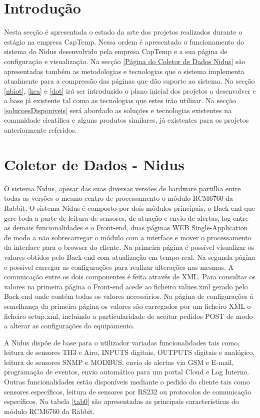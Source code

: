 
\section{Introdução}
Nesta secção é apresentada o estado da arte dos projetos realizados durante o estágio na empresa CapTemp. Nessa ordem é apresentado o funcionamento do sistema do Nidus desenvolvido pela empresa CapTemp e a sua página de configuração e visualização. Na secção \ref{Página do Coletor de Dados Nidus} são apresentadas também as metodologias e tecnologias que o sistema implementa atualmente para a compressão das páginas que dão suporte ao sistema. Na secção \ref{nbiot}, \ref{kea} e  \ref{dot} irá ser introduzido o plano inicial dos projetos a desenvolver e a base já existente tal como as tecnologias que estes irão utilizar. Na secção \ref{solucoesDisponiveis} será abordado as soluções e tecnologias existentes na comunidade científica e alguns produtos similares, já existentes para os projetos anteriormente referidos.

\section{Coletor de Dados - Nidus} \label{Coletor de Dados - Nidus}
\par
O sistema Nidus, apesar das suas diversas versões de hardware partilha entre todas as versões o mesmo centro de processamento o módulo RCM6760 da Rabbit. O sistema Nidus é composto por dois módulos principais, o Back-end que gere toda a parte de leitura de sensores, de atuação e envio de alertas, log entre as demais funcionalidades e o Front-end, duas páginas WEB Single-Application de modo a não sobrecarregar o módulo com a interface e mover o processamento da interface para o browser do cliente. Na primeira página é possível visualizar os valores obtidos pelo Back-end com atualização em tempo real. Na segunda página e possível carregar as configurações para realizar alterações nas mesmas. A comunicação entre os dois componentes é feita através de XML. Para consultar os valores na primeira página o Front-end acede ao ficheiro values.xml gerado pelo Back-end onde contém todas os valores necessários. Na página de configurações á semelhança da primeira página os valores são carregados por um ficheiro XML o ficheiro setup.xml, incluindo a particularidade de aceitar pedidos POST de modo a alterar as configurações do equipamento.
\par A Nidus dispõe de base para o utilizador variadas funcionalidades tais como, leitura de sensores TH3 e Airo, INPUTS digitais, OUTPUTS digitais e analógico, leitura de sensores SNMP e MODBUS, envio de alertas via GSM e E-mail, programação de eventos, envio automático para um portal Cloud e Log Interno. Outras funcionalidades estão disponíveis mediante o pedido do cliente tais como sensores específicos, leitura de sensores por RS232 ou protocolos de comunicação específicos.
Na tabela \ref{tab0} são apresentadas as principais características do módulo RCM6760 da Rabbit.




